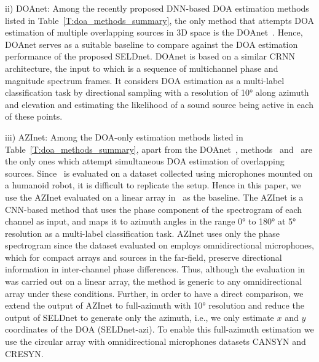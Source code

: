 \documentclass[journal]{IEEEtran}
\begin{document}
ii) DOAnet: Among the recently proposed DNN-based DOA estimation methods listed in Table~\ref{T:doa_methods_summary}, the only method that attempts DOA estimation of multiple overlapping sources in 3D space is the DOAnet~\cite{Adavanne2018_EUSIPCO}. Hence, DOAnet serves as a suitable baseline to compare against the DOA estimation performance of the proposed SELDnet.
DOAnet is based on a similar CRNN architecture, the input to which is a sequence of multichannel phase and magnitude spectrum frames. It considers DOA estimation as a multi-label classification task by directional sampling with a resolution of \ang{10} along azimuth and elevation and estimating the likelihood of a sound source being active in each of these points.

iii) AZInet: Among the DOA-only estimation methods listed in Table~\ref{T:doa_methods_summary}, apart from the DOAnet~\cite{Adavanne2018_EUSIPCO}, methods~\cite{Chakrabarty2017_nips} and~\cite{He2018} are the only ones which attempt simultaneous DOA estimation of overlapping sources. Since~\cite{He2018} is evaluated on a dataset collected using microphones mounted on a humanoid robot, it is difficult to replicate the setup. Hence in this paper, we use the AZInet evaluated on a linear array in~\cite{Chakrabarty2017_nips} as the baseline. The AZInet is a CNN-based method that uses the phase component of the spectrogram of each channel as input, and maps it to azimuth angles in the range \ang{0} to \ang{180} at \ang{5} resolution as a multi-label classification task. AZInet uses only the phase spectrogram since the dataset evaluated on employs omnidirectional microphones, which for compact arrays and sources in the far-field, preserve directional information in inter-channel phase differences. Thus, although the evaluation in~\cite{Chakrabarty2017_nips} was carried out on a linear array, the method is generic to any omnidirectional array under these conditions. Further, in order to have a direct comparison, we extend the output of AZInet to full-azimuth with \ang{10} resolution and reduce the output of SELDnet to generate only the azimuth, i.e., we only estimate $x$ and $y$ coordinates of the DOA (SELDnet-azi). To enable this full-azimuth estimation we use the circular array with omnidirectional microphones datasets CANSYN and CRESYN.
\end{document}
